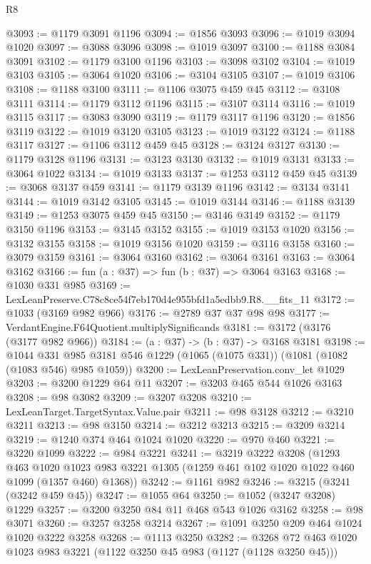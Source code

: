\begin{lexlean}{R8}
\begin{coremodule}
@3093 := @1179 @3091 @1196
@3094 := @1856 @3093
@3096 := @1019 @3094 @1020
@3097 := @3088 @3096
@3098 := @1019 @3097
@3100 := @1188 @3084 @3091
@3102 := @1179 @3100 @1196
@3103 := @3098 @3102
@3104 := @1019 @3103
@3105 := @3064 @1020
@3106 := @3104 @3105
@3107 := @1019 @3106
@3108 := @1188 @3100
@3111 := @1106 @3075 @459 @45
@3112 := @3108 @3111
@3114 := @1179 @3112 @1196
@3115 := @3107 @3114
@3116 := @1019 @3115
@3117 := @3083 @3090
@3119 := @1179 @3117 @1196
@3120 := @1856 @3119
@3122 := @1019 @3120 @3105
@3123 := @1019 @3122
@3124 := @1188 @3117
@3127 := @1106 @3112 @459 @45
@3128 := @3124 @3127
@3130 := @1179 @3128 @1196
@3131 := @3123 @3130
@3132 := @1019 @3131
@3133 := @3064 @1022
@3134 := @1019 @3133
@3137 := @1253 @3112 @459 @45
@3139 := @3068 @3137 @459
@3141 := @1179 @3139 @1196
@3142 := @3134 @3141
@3144 := @1019 @3142 @3105
@3145 := @1019 @3144
@3146 := @1188 @3139
@3149 := @1253 @3075 @459 @45
@3150 := @3146 @3149
@3152 := @1179 @3150 @1196
@3153 := @3145 @3152
@3155 := @1019 @3153 @1020
@3156 := @3132 @3155
@3158 := @1019 @3156 @1020
@3159 := @3116 @3158
@3160 := @3079 @3159
@3161 := @3064 @3160
@3162 := @3064 @3161
@3163 := @3064 @3162
@3166 := fun (a : @37) => fun (b : @37) => @3064 @3163
@3168 := @1030 @331 @985
@3169 := LexLeanPreserve.C78c8ce54f7eb170d4e955bfd1a5edbb9.R8.__fits_11
@3172 := @1033 (@3169 @982 @966)
@3176 := @2789 @37 @37 @98 @98
@3177 := VerdantEngine.F64Quotient.multiplySignificands
@3181 := @3172 (@3176 (@3177 @982 @966))
@3184 := (a : @37) -> (b : @37) -> @3168 @3181
@3198 := @1044
    @331
    @985
    @3181
    @546
    @1229
    (@1065 (@1075 @331))
    (@1081 (@1082 (@1083 @546) @985 @1059))
@3200 := LexLeanPreservation.conv_let @1029
@3203 := @3200 @1229 @64 @11
@3207 := @3203 @465 @544 @1026 @3163
@3208 := @98 @3082
@3209 := @3207 @3208
@3210 := LexLeanTarget.TargetSyntax.Value.pair
@3211 := @98 @3128
@3212 := @3210 @3211
@3213 := @98 @3150
@3214 := @3212 @3213
@3215 := @3209 @3214
@3219 := @1240 @374 @464 @1024 @1020
@3220 := @970 @460
@3221 := @3220 @1099
@3222 := @984 @3221
@3241 := @3219
    @3222
    @3208
    (@1293
      @463
      @1020
      @1023
      @983
      @3221
      @1305
      (@1259 @461 @102 @1020 @1022 @460 @1099 (@1357 @460) @1368))
@3242 := @1161 @982
@3246 := @3215 (@3241 (@3242 @459 @45))
@3247 := @1055 @64
@3250 := @1052 (@3247 @3208) @1229
@3257 := @3200 @3250 @84 @11 @468 @543 @1026 @3162
@3258 := @98 @3071
@3260 := @3257 @3258 @3214
@3267 := @1091 @3250 @209 @464 @1024 @1020 @3222 @3258
@3268 := @1113 @3250
@3282 := @3268 @72 @463 @1020 @1023 @983 @3221 (@1122 @3250 @45 @983 (@1127 (@1128 @3250 @45)))

\end{coremodule}
\end{lexlean}
